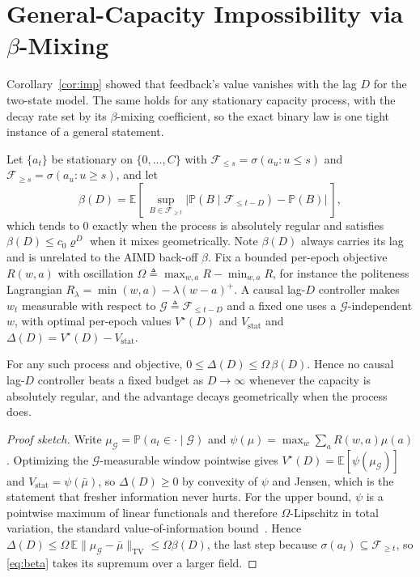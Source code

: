 \section{General-Capacity Impossibility via $\beta$-Mixing}
\label{app:beta}
Corollary~\ref{cor:imp} showed that feedback's value vanishes with the lag $D$ for
the two-state model. The same holds for any stationary capacity process, with the
decay rate set by its $\beta$-mixing coefficient, so the exact binary law is one
tight instance of a general statement.

Let $\{a_t\}$ be stationary on $\{0,\dots,C\}$ with
$\mathcal F_{\le s}=\sigma(a_u:u\le s)$ and
$\mathcal F_{\ge s}=\sigma(a_u:u\ge s)$, and let
\begin{equation}\label{eq:beta}
\beta(D)=\mathbb E\!\left[\ \sup_{B\in\mathcal F_{\ge t}}\big|\mathbb P(B\mid\mathcal F_{\le t-D})-\mathbb P(B)\big|\ \right],
\end{equation}
which tends to $0$ exactly when the process is absolutely regular and satisfies
$\beta(D)\le c_0\varrho^{D}$ when it mixes geometrically. Note $\beta(D)$ always
carries its lag and is unrelated to the AIMD back-off $\beta$. Fix a bounded
per-epoch objective $R(w,a)$ with oscillation
$\Omega\triangleq\max_{w,a}R-\min_{w,a}R$, for instance the politeness Lagrangian
$R_\lambda=\min(w,a)-\lambda(w-a)^{+}$. A causal lag-$D$ controller makes $w_t$
measurable with respect to $\mathcal G\triangleq\mathcal F_{\le t-D}$ and a fixed
one uses a $\mathcal G$-independent $w$, with optimal per-epoch values
$V^\star(D)$ and $V_{\mathrm{stat}}$ and $\Delta(D)=V^\star(D)-V_{\mathrm{stat}}$.

\begin{theorem}\label{thm:beta}
For any such process and objective, $0\le\Delta(D)\le\Omega\,\beta(D)$. Hence no
causal lag-$D$ controller beats a fixed budget as $D\to\infty$ whenever the
capacity is absolutely regular, and the advantage decays geometrically when the
process does.
\end{theorem}
\begin{proof}[Proof sketch]
Write $\mu_{\mathcal G}=\mathbb P(a_t\in\cdot\mid\mathcal G)$ and
$\psi(\mu)=\max_w\sum_a R(w,a)\mu(a)$. Optimizing the $\mathcal G$-measurable
window pointwise gives $V^\star(D)=\mathbb E[\psi(\mu_{\mathcal G})]$ and
$V_{\mathrm{stat}}=\psi(\bar\mu)$, so $\Delta(D)\ge0$ by convexity of $\psi$ and
Jensen, which is the statement that fresher information never hurts. For the upper
bound, $\psi$ is a pointwise maximum of linear functionals and therefore
$\Omega$-Lipschitz in total variation, the standard value-of-information
bound~\cite{howard1966,delaragossner}. Hence
$\Delta(D)\le\Omega\,\mathbb E\|\mu_{\mathcal G}-\bar\mu\|_{\mathrm{TV}}\le\Omega\beta(D)$,
the last step because $\sigma(a_t)\subseteq\mathcal F_{\ge t}$, so \eqref{eq:beta}
takes its supremum over a larger field.
\end{proof}


